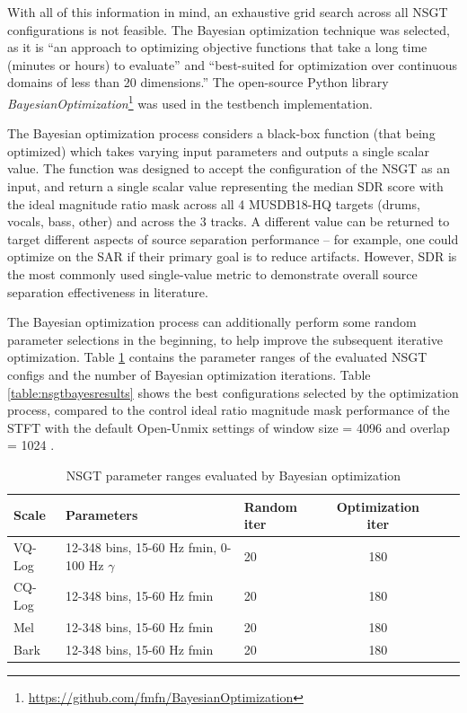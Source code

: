 \documentclass[report.tex]{subfiles}
\begin{document}
With all of this information in mind, an exhaustive grid search across all NSGT configurations is not feasible. The Bayesian optimization technique \cite{bayesian} was selected, as it is ``an approach to optimizing objective functions that take a long time (minutes or hours) to evaluate'' and ``best-suited for optimization over continuous domains of less than 20 dimensions.'' The open-source Python library \textit{BayesianOptimization}\footnote{\href{https://github.com/fmfn/BayesianOptimization}{https://github.com/fmfn/BayesianOptimization}} was used in the testbench implementation.

The Bayesian optimization process considers a black-box function (that being optimized) which takes varying input parameters and outputs a single scalar value. The function was designed to accept the configuration of the NSGT as an input, and return a single scalar value representing the median SDR score with the ideal magnitude ratio mask across all 4 MUSDB18-HQ targets (drums, vocals, bass, other) and across the 3 tracks. A different value can be returned to target different aspects of source separation performance -- for example, one could optimize on the SAR if their primary goal is to reduce artifacts. However, SDR is the most commonly used single-value metric to demonstrate overall source separation effectiveness in literature.

The Bayesian optimization process can additionally perform some random parameter selections in the beginning, to help improve the subsequent iterative optimization. Table \ref{table:nsgtparamsirm} contains the parameter ranges of the evaluated NSGT configs and the number of Bayesian optimization iterations. Table \ref{table:nsgtbayesresults} shows the best configurations selected by the optimization process, compared to the control ideal ratio magnitude mask performance of the STFT with the default Open-Unmix settings of window size = 4096 and overlap = 1024 \cite{umx}.

\begin{table}[ht]
	\centering
\begin{tabular}{ |l|l|l|c|c|c| }
	 \hline
	  Scale & Parameters & Random iter & Optimization iter \\
	 \hline
	 \hline
	 VQ-Log & 12-348 bins, 15-60 Hz fmin, 0-100 Hz $\gamma$ & 20 & 180 \\
	 \hline
	 CQ-Log & 12-348 bins, 15-60 Hz fmin & 20 & 180 \\
	 \hline
	 Mel & 12-348 bins, 15-60 Hz fmin & 20 & 180 \\
	 \hline
	 Bark & 12-348 bins, 15-60 Hz fmin & 20 & 180 \\
	 \hline
\end{tabular}
	\caption{NSGT parameter ranges evaluated by Bayesian optimization}
	\label{table:nsgtparamsirm}
\end{table}
\end{document}
